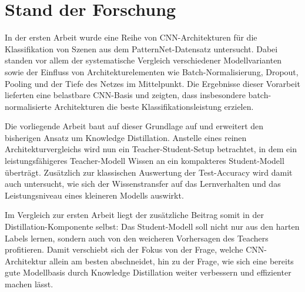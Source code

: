 \section{Stand der Forschung}
\label{sec:stand-der-forschung}

In der ersten Arbeit \cite{steidlehenssler2026milestone1} wurde eine Reihe von CNN-Architekturen für die Klassifikation von Szenen aus dem PatternNet-Datensatz untersucht.
Dabei standen vor allem der systematische Vergleich verschiedener Modellvarianten sowie der Einfluss von Architekturelementen wie Batch-Normalisierung, Dropout, Pooling und der Tiefe des Netzes im Mittelpunkt.
Die Ergebnisse dieser Vorarbeit lieferten eine belastbare CNN-Basis und zeigten, dass insbesondere batch-normalisierte Architekturen die beste Klassifikationsleistung erzielen.

Die vorliegende Arbeit baut auf dieser Grundlage auf und erweitert den bisherigen Ansatz um Knowledge Distillation.
Anstelle eines reinen Architekturvergleichs wird nun ein Teacher-Student-Setup betrachtet, in dem ein leistungsfähigeres Teacher-Modell Wissen an ein kompakteres Student-Modell überträgt.
Zusätzlich zur klassischen Auswertung der Test-Accuracy wird damit auch untersucht, wie sich der Wissenstransfer auf das Lernverhalten und das Leistungsniveau eines kleineren Modells auswirkt.

Im Vergleich zur ersten Arbeit liegt der zusätzliche Beitrag somit in der Distillation-Komponente selbst: Das Student-Modell soll nicht nur aus den harten Labels lernen, sondern auch von den weicheren Vorhersagen des Teachers profitieren.
Damit verschiebt sich der Fokus von der Frage, welche CNN-Architektur allein am besten abschneidet, hin zu der Frage, wie sich eine bereits gute Modellbasis durch Knowledge Distillation weiter verbessern und effizienter machen lässt.
